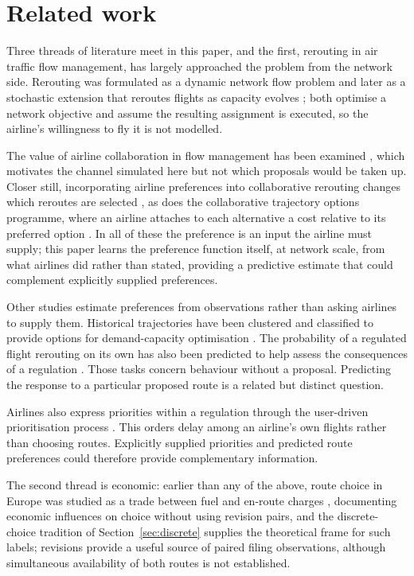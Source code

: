 \documentclass[preprint,authoryear,12pt]{elsarticle}
\begin{document}
\section{Related work}
\label{sec:related}

Three threads of literature meet in this paper, and the first,
rerouting in air traffic flow management, has largely approached the
problem from the network side. Rerouting was formulated as a dynamic
network flow problem \citep{bertsimas2000} and later as a stochastic
extension that reroutes flights as capacity evolves
\citep{mukherjee2009}; both optimise a network objective and assume
the resulting assignment is executed, so the airline's willingness to
fly it is not modelled.

The value of airline collaboration in flow management has been
examined \citep{castelli2012}, which motivates the channel simulated
here but not which proposals would be taken up. Closer still,
incorporating airline preferences into collaborative rerouting changes
which reroutes are selected \citep{murca2018,xu2020}, as does the
collaborative trajectory options programme, where an airline attaches
to each alternative a cost relative to its preferred option
\citep{kulkarni2018}. In all of these the preference is an input the
airline must supply; this paper learns the preference function
itself, at network scale, from what airlines did rather than stated,
providing a predictive estimate that could complement explicitly supplied
preferences.

Other studies estimate preferences from observations rather than asking
airlines to supply them. Historical trajectories have been clustered and
classified to provide options for demand-capacity optimisation
\citep{degiovanni2024}. The probability of a regulated flight rerouting
on its own has also been predicted to help assess the consequences of
a regulation \citep{dalmau2022}. Those tasks concern behaviour without
a proposal. Predicting the response to a particular proposed route is
a related but distinct question.

Airlines also express priorities within a regulation through the
user-driven prioritisation process \citep{pilon2021,ruiz2019}. This
orders delay among an airline's own flights rather than choosing routes.
Explicitly supplied priorities and predicted route preferences could
therefore provide complementary information.

The second thread is economic: earlier than any of the above, route
choice in Europe was studied as a trade between fuel and en-route
charges \citep{delgado2015}, documenting economic influences on choice without using revision pairs, and the discrete-choice tradition of
Section~\ref{sec:discrete} supplies the theoretical frame for such
labels; revisions provide a useful source of paired filing observations, although
simultaneous availability of both routes is not established.
\end{document}
